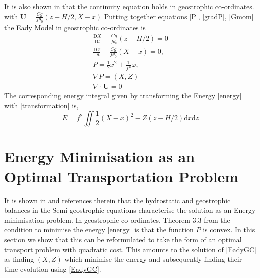 It is also shown in \cite{Cullen2006a} that the continuity equation holds in geostrophic co-ordinates. with $\bm{U} = \frac{Cg}{f\theta _0}\left(z-H/2, X-x\right) $
Putting together equations \ref{P}, \ref{gradP}, \ref{Gmom} the Eady Model in geostrophic co-ordinates is 
\begin{equation}
\begin{aligned}
\frac{\mathrm{D}X}{\mathrm{D}t} -\frac{Cg}{f\theta _0}\left(z-H/2\right) = 0 \\
\frac{\mathrm{D}Z}{\mathrm{D}t} - \frac{Cg}{f\theta_0}\left(X - x\right) = 0,\\
P = \frac{1}{2}x^2 + \frac{1}{f^2}\varphi,\\
\nabla P = (X,Z)\\
\nabla \cdot \bm{U} = 0
\end{aligned}
\label{EadyGC}
\end{equation}
The corresponding energy integral given by transforming the Energy \ref{energy} with \ref{transformation} is,
\begin{equation}
E = f^2 \iint \frac{1}{2}\left(X-x\right)^2 - Z\left(z - H/2\right)\textrm{d}x\textrm{d}z
\label{energy}
\end{equation}
\section{Energy Minimisation as an Optimal Transportation Problem}
It is shown in \cite{Cullen2006a} and references therein that the hydrostatic and geostrophic balances in the Semi-geostrophic equations characterise the solution as an Energy minimisation problem. In geostrophic co-ordinates, Theorem 3.3 from \cite{Cullen2006a} the condition to minimise the energy \ref{energy} is that the function $P$ is convex. In this section we show that this can be reformulated to take the form of an optimal transport problem with quadratic cost. This amounts to the solution of \ref{EadyGC} as finding $\left(X, Z\right)$ which minimise the energy and subsequently finding their time evolution using \ref{EadyGC}.

